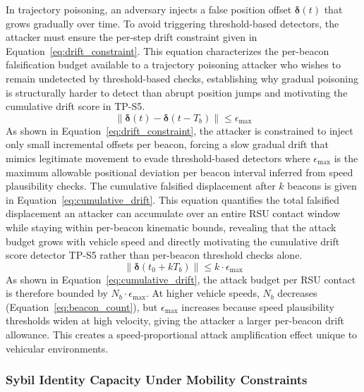 \documentclass[12pt, a4paper]{report}
\begin{document}
In trajectory poisoning, an adversary injects a false position offset
$\boldsymbol{\delta}(t)$ that grows gradually over time. To avoid triggering
threshold-based detectors, the attacker must ensure the per-step drift
constraint given in Equation~\ref{eq:drift_constraint}.
\newline
\newline
This equation characterizes the per-beacon falsification budget
available to a trajectory poisoning attacker who wishes to remain
undetected by threshold-based checks, establishing why gradual
poisoning is structurally harder to detect than abrupt position jumps
and motivating the cumulative drift score in TP-S5.
\begin{equation}
  \|\boldsymbol{\delta}(t) - \boldsymbol{\delta}(t-T_b)\| \leq \epsilon_{\max}
  \label{eq:drift_constraint}
\end{equation}
As shown in
Equation~\ref{eq:drift_constraint}, the attacker is constrained to inject
only small incremental offsets per beacon, forcing a slow gradual drift
that mimics legitimate movement to evade threshold-based detectors where $\epsilon_{\max}$ is the maximum allowable positional deviation per
beacon interval inferred from speed plausibility checks.
\newline
\newline
The cumulative falsified displacement after $k$ beacons is given in
Equation~\ref{eq:cumulative_drift}. This equation quantifies the total falsified displacement an attacker
can accumulate over an entire RSU contact window while staying within
per-beacon kinematic bounds, revealing that the attack budget grows
with vehicle speed and directly motivating the cumulative drift score
detector TP-S5 rather than per-beacon threshold checks alone.
\begin{equation}
  \|\boldsymbol{\delta}(t_0 + k T_b)\| \leq k \cdot \epsilon_{\max}
  \label{eq:cumulative_drift}
\end{equation}
As shown in Equation~\ref{eq:cumulative_drift}, the attack budget
per RSU contact is therefore bounded by $N_b \cdot \epsilon_{\max}$.
At higher vehicle speeds, $N_b$ decreases (Equation~\ref{eq:beacon_count}),
but $\epsilon_{\max}$ increases because speed plausibility thresholds widen
at high velocity, giving the attacker a larger per-beacon drift allowance.
This creates a speed-proportional attack amplification effect unique to
vehicular environments.

\subsubsection{Sybil Identity Capacity Under Mobility Constraints}
\end{document}
